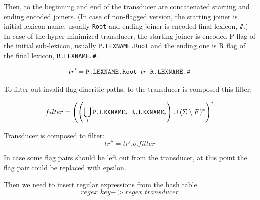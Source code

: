 \documentclass[11pt]{article}
\begin{document}
Then, to the beginning and end of the transducer are concatenated starting and ending encoded joiners. (In case of non-flagged version, the starting joiner is initial lexicon name, usually \texttt{Root} and ending joiner is encoded final lexicon, \texttt{\#}.) In case of the hyper-minimized transducer, the starting joiner is encoded P flag of the initial sub-lexicon, usually \texttt{P.LEXNAME.Root} and the ending one is R flag of the final lexicon, \texttt{R.LEXNAME.\#}.

\begin{equation}\label{trie_star}
tr' = \verb+P.LEXNAME.Root + tr \verb+ R.LEXNAME.#+
\end{equation}

To filter out invalid flag diacritic paths, to the transducer is composed this filter:

\begin{equation}\label{filter}
filter = \left( \left(\bigcup_{i} \verb+P.LEXNAME+_i \verb+ R.LEXNAME+_i \right) \cup (\Sigma \setminus F) ^*\right)^* 
\end{equation}



Transducer is composed to filter:
\begin{equation}\label{composition}
tr'' = tr' .o. filter
\end{equation}

In case some flag pairs should be left out from the transducer, at this point the flag pair could be replaced with epsilon.


Then we need to insert regular expressions from the hash table.
\begin{equation}\label{composition}
regex\_key -> regex\_transducer
\end{equation}
\end{document}
